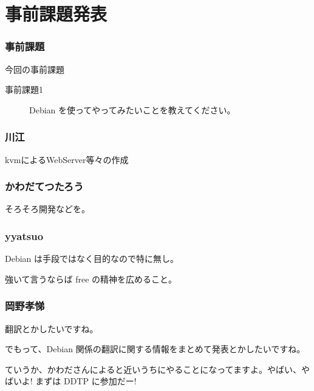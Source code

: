 \documentclass[cjk,dvipdfmx,10pt,%
hyperref={bookmarks=true,bookmarksnumbered=true,bookmarksopen=false,%
colorlinks=false,%
pdftitle={第 64 回 関西 Debian 勉強会},%
pdfauthor={倉敷・のがた・佐々木・かわだ},%
pdfsubject={資料},%
}]{beamer}
\begin{document}

\section{事前課題発表}


\begin{frame}[fragile]
\frametitle{事前課題}

\begin{block}{今回の事前課題}
  \begin{description}
  \item[事前課題1] Debian を使ってやってみたいことを教えてください。
  \end{description}
\end{block}

\end{frame}


\begin{frame}
  \frametitle{ 川江 }
  kvmによるWebServer等々の作成
\end{frame}

\begin{frame}
  \frametitle{ かわだてつたろう }
  そろそろ開発などを。
\end{frame}

\begin{frame}
  \frametitle{ yyatsuo }
  Debian は手段ではなく目的なので特に無し。

  強いて言うならば free の精神を広めること。
\end{frame}

\begin{frame}
  \frametitle{ 岡野孝悌 }

翻訳とかしたいですね。

でもって、Debian 関係の翻訳に関する情報をまとめて発表とかしたいですね。

ていうか、かわださんによると近いうちにやることになってますよ。やばい、やばいよ! まずは DDTP に参加だー!
\end{frame}
\end{document}
